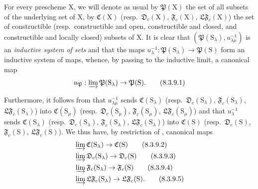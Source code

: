 \begin{env}[8.3.9]
\label{IV.8.3.9}
For every prescheme $\mathrm{X}$, we will denote as usual by $\mathfrak{P}(\mathrm{X})$ the set of all subsets of the underlying set of $\mathrm{X}$, by $\mathfrak{C}(\mathrm{X})$ (resp.\ $\mathfrak{D}_c(\mathrm{X})$, $\mathfrak{F}_c(\mathrm{X})$, $\mathfrak{LF}_c(\mathrm{X})$) the set of constructible (resp.\ constructible and open, constructible and closed, and constructible and locally closed) subsets of $\mathrm{X}$.
It is clear that $(\mathfrak{P}(\mathrm{S}_\lambda),u_{\lambda\mu}^{-1})$ is an \emph{inductive system of sets} and that the maps $u_\lambda^{-1}:\mathfrak{P}(\mathrm{S}_\lambda)\to\mathfrak{P}(\mathrm{S})$ form an inductive system of maps, whence, by passing to the inductive limit, a canonical map
\begin{equation}
  u_\mathfrak{P}:\varinjlim\mathfrak{P}(\mathrm{S}_\lambda)\to\mathfrak{P}(\mathrm{S}).
  \tag{8.3.9.1}
\label{IV.8.3.9.1}
\end{equation}

Furthermore, it follows from  that $u_{\lambda\mu}^{-1}$ sends $\mathfrak{C}(\mathrm{S}_\lambda)$ (resp.\ $\mathfrak{D}_c(\mathrm{S}_\lambda)$, $\mathfrak{F}_c(\mathrm{S}_\lambda)$, $\mathfrak{LF}_c(\mathrm{S}_\lambda)$) into $\mathfrak{C}(\mathrm{S}_\mu)$ (resp.\ $\mathfrak{D}_c(\mathrm{S}_\mu)$, $\mathfrak{F}_c(\mathrm{S}_\mu)$, $\mathfrak{LF}_c(\mathrm{S}_\mu)$) and that $u_\lambda^{-1}$ sends $\mathfrak{C}(\mathrm{S}_\lambda)$ (resp.\ $\mathfrak{D}_c(\mathrm{S}_\lambda)$, $\mathfrak{F}_c(\mathrm{S}_\lambda)$, $\mathfrak{LF}_c(\mathrm{S}_\lambda)$) into $\mathfrak{C}(\mathrm{S})$ (resp.\ $\mathfrak{D}_c(\mathrm{S})$, $\mathfrak{F}_c(\mathrm{S})$, $\mathfrak{LF}_c(\mathrm{S})$).
We thus have, by restriction of , canonical maps
\begin{align}
  &\varinjlim\mathfrak{C}(\mathrm{S}_\lambda)\to\mathfrak{C}(\mathrm{S}) \tag{8.3.9.2}\label{IV.8.3.9.2}\\
  &\varinjlim\mathfrak{D}_c(\mathrm{S}_\lambda)\to\mathfrak{D}_c(\mathrm{S}) \tag{8.3.9.3}\label{IV.8.3.9.3}\\
  &\varinjlim\mathfrak{F}_c(\mathrm{S}_\lambda)\to\mathfrak{F}_c(\mathrm{S}) \tag{8.3.9.4}\label{IV.8.3.9.4}\\
  &\varinjlim\mathfrak{LF}_c(\mathrm{S}_\lambda)\to\mathfrak{LF}_c(\mathrm{S}). \tag{8.3.9.5}
\label{IV.8.3.9.5}
\end{align}
\end{env}

